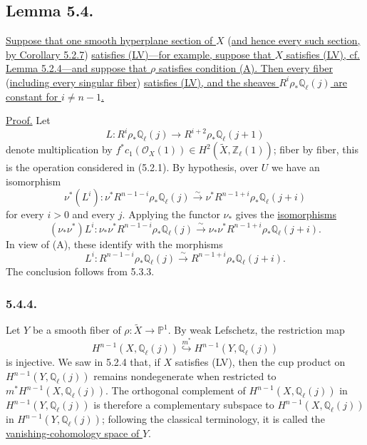 \subsection*{Lemma 5.4.}
\underline{Suppose that one smooth hyperplane section of $X$} (\underline{and hence
every such section, by Corollary 5.2.7}) \underline{satisfies (LV)---for example, suppose
that $X$ satisfies (LV), cf. Lemma 5.2.4---and suppose that $\rho$ satisfies
condition (A).  Then every fiber} (\underline{including every singular fiber}) \underline{satisfies
(LV), and the sheaves $R^i\rho_*\mathbb Q_\ell(j)$ are constant for
$i\neq n-1$.}

\underline{Proof.}
Let
\[
L:R^i\rho_*\mathbb Q_\ell(j)
\longrightarrow R^{i+2}\rho_*\mathbb Q_\ell(j+1)
\]
denote multiplication by
$f^*c_1(\mathcal O_X(1))\in
H^2(\widetilde X,\mathbb Z_\ell(1))$; fiber by fiber, this is the operation
considered in (5.2.1).  By hypothesis, over $U$ we have an isomorphism
\begin{equation}\tag{5.4.1}
\nu^*(L^i):
\nu^*R^{n-1-i}\rho_*\mathbb Q_\ell(j)
\overset{\sim}{\longrightarrow}
\nu^*R^{n-1+i}\rho_*\mathbb Q_\ell(j+i)
\end{equation}
for every $i>0$ and every $j$.  Applying the functor $\nu_*$ gives the
\underline{isomorphisms}
\begin{equation}\tag{5.4.2}
(\nu_*\nu^*)L^i:
\nu_*\nu^*R^{n-1-i}\rho_*\mathbb Q_\ell(j)
\overset{\sim}{\longrightarrow}
\nu_*\nu^*R^{n-1+i}\rho_*\mathbb Q_\ell(j+i).
\end{equation}
In view of (A), these identify with the morphisms
\begin{equation}\tag{5.4.3}
L^i:R^{n-1-i}\rho_*\mathbb Q_\ell(j)
\overset{\sim}{\longrightarrow}
R^{n-1+i}\rho_*\mathbb Q_\ell(j+i).
\end{equation}
The conclusion follows from 5.3.3.

\subsubsection*{5.4.4.}
Let $Y$ be a smooth fiber of
$\rho:\widetilde X\to\mathbb P^1$.  By weak Lefschetz, the restriction map
\[
H^{n-1}(X,\mathbb Q_\ell(j))
\overset{m^*}{\hookrightarrow}
H^{n-1}(Y,\mathbb Q_\ell(j))
\]
is injective.  We saw in 5.2.4 that, if $X$ satisfies (LV), then the cup
product on $H^{n-1}(Y,\mathbb Q_\ell(j))$ remains nondegenerate when
restricted to $m^*H^{n-1}(X,\mathbb Q_\ell(j))$.  The orthogonal complement
of $H^{n-1}(X,\mathbb Q_\ell(j))$ in
$H^{n-1}(Y,\mathbb Q_\ell(j))$ is therefore a complementary subspace to
$H^{n-1}(X,\mathbb Q_\ell(j))$ in
$H^{n-1}(Y,\mathbb Q_\ell(j))$; following the classical terminology, it is
called the \underline{vanishing-cohomology space of $Y$}.

